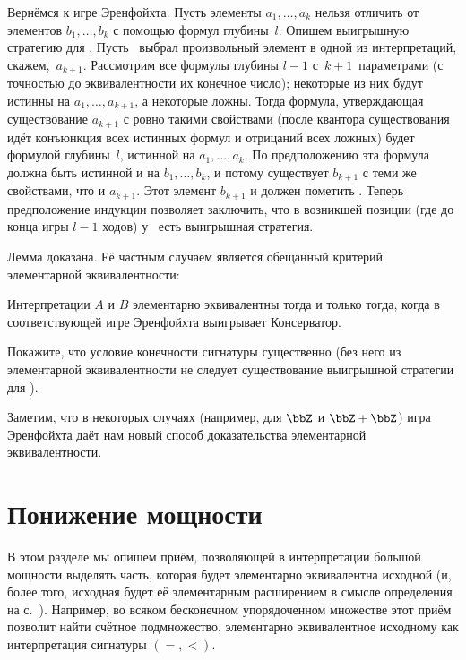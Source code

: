 Вернёмся к игре Эренфойхта. Пусть
элементы $a_1,\dots,a_k$ нельзя отличить от
элементов $b_1,\dots,b_k$ с помощью
формул глубины~$l$. Опишем выигрышную стратегию для
\К. Пусть \Н\ выбрал произвольный элемент в одной из
интерпретаций, скажем,~$a_{k+1}$. Рассмотрим все формулы глубины
$l-1$ с~$k+1$~параметрами (с точностью до эквивалентности их
конечное число); некоторые из них будут истинны на
$a_1,\dots,a_{k+1}$, а некоторые ложны. Тогда формула, утверждающая
существование $a_{k+1}$ с ровно такими свойствами (после квантора
существования идёт конъюнкция всех истинных формул и отрицаний
всех ложных) будет формулой глубины~$l$, истинной на
$a_1,\dots,a_k$. По предположению эта формула должна быть
истинной и на $b_1,\dots,b_k$, и потому существует $b_{k+1}$ с
теми же свойствами, что и $a_{k+1}$. Этот элемент $b_{k+1}$ и
должен пометить \К. Теперь предположение индукции позволяет
заключить, что в возникшей позиции (где до конца игры $l-1$
ходов) у \К\ есть выигрышная стратегия.

Лемма доказана. Её частным случаем является обещанный
критерий элементарной эквивалентности:

\begin{theorem}
        \label{eurenfeucht}%
Интерпретации $A$ и $B$ элементарно эквивалентны тогда и только
тогда, когда в соответствующей игре Эренфойхта выигрывает
Консерватор.
\end{theorem}

\begin{problem}
Покажите, что условие конечности сигнатуры существенно (без него
из элементарной эквивалентности не следует существование выигрышной
стратегии для \К).
\end{problem}

Заметим, что в некоторых случаях (например, для
$\bbZ$ и $\bbZ+\bbZ$) игра Эренфойхта даёт нам новый способ
доказательства элементарной эквивалентности.

\section{Понижение мощности}
        \label{lowenheim-skolem-1}%

В этом разделе мы опишем приём, позволяющей в интерпретации
большой мощности выделять часть, которая будет элементарно
эквивалентна исходной (и, более того, исходная будет её
элементарным расширением в смысле определения на
с.~\pageref{elementary-extension}). Например, во всяком
бесконечном упорядоченном множестве этот приём позволит найти
счётное подмножество, элементарно эквивалентное исходному как
интерпретация сигнатуры $({=},{<})$.

